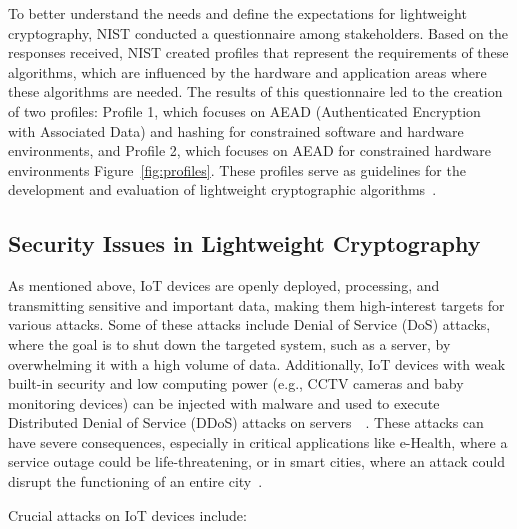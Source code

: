 To better understand the needs and define the expectations for lightweight cryptography, NIST conducted a questionnaire among stakeholders. Based on the responses received, NIST created profiles that represent the requirements of these algorithms, which are influenced by the hardware and application areas where these algorithms are needed. The results of this questionnaire led to the creation of two profiles: Profile 1, which focuses on AEAD (Authenticated Encryption with Associated Data) and hashing for constrained software and hardware environments, and Profile 2, which focuses on AEAD for constrained hardware environments Figure~\ref{fig:profiles}. These profiles serve as guidelines for the development and evaluation of lightweight cryptographic algorithms~\cite{mckay2016report}.



\subsection{Security Issues in Lightweight Cryptography}
As mentioned above, IoT devices are openly deployed, processing, and transmitting sensitive and important data, making them high-interest targets for various attacks. Some of these attacks include Denial of Service (DoS) attacks, where the goal is to shut down the targeted system, such as a server, by overwhelming it with a high volume of data. Additionally, IoT devices with weak built-in security and low computing power (e.g., CCTV cameras and baby monitoring devices) can be injected with malware and used to execute Distributed Denial of Service (DDoS) attacks on servers~\cite{mckay2016report}~\cite{salim2020distributed}. These attacks can have severe consequences, especially in critical applications like e-Health, where a service outage could be life-threatening, or in smart cities, where an attack could disrupt the functioning of an entire city~\cite{dhanda2020lightweight}.

Crucial attacks on IoT devices include:

